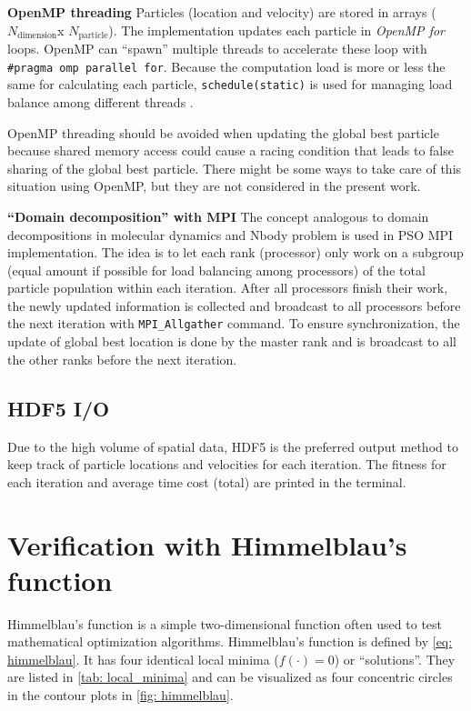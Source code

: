 \documentclass[conference, 10pt]{IEEEtran}
\newcommand{\N}[1]{\ensuremath{N_\text{#1}}}
\newcommand{\Np}{\N{particle}}
\newcommand{\Ndim}{\N{dimension}}
\newcommand{\code}[1]{\texttt{\textcolor{BrickRed}{#1}}}
\begin{document}
\noindent\textbf{OpenMP threading}
Particles (location and velocity) are stored in arrays (\Ndim x \Np).
The implementation updates each particle in \emph{OpenMP for} loops.
OpenMP can ``spawn'' multiple threads to accelerate these loop with \code{\#pragma omp parallel for}.
Because the computation load is more or less the same for calculating each particle, \code{schedule(static)} is used for managing load balance among different threads \cite{eijkhout_2016, eijkhout_2016_2}.

OpenMP threading should be avoided when updating the global best particle because shared memory access could cause a racing condition that leads to false sharing of the global best particle.
There might be some ways to take care of this situation using OpenMP, but they are not considered in the present work. 
\medskip


\noindent\textbf{``Domain decomposition'' with MPI}
The concept analogous to domain decompositions in molecular dynamics and Nbody problem \cite{eijkhout_2016, Bindel_2010} is used in PSO MPI implementation.
The idea is to let each rank (processor) only work on a subgroup (equal amount if possible for load balancing among processors) of the total particle population within each iteration.
After all processors finish their work, the newly updated information is collected and broadcast to all processors before the next iteration with \code{MPI\_Allgather} command.
To ensure synchronization, the update of global best location is done by the master rank and is broadcast to all the other ranks before the next iteration.
\medskip


\subsection{HDF5 I/O}
Due to the high volume of spatial data, HDF5 is the preferred output method to keep track of particle locations and velocities for each iteration. 
The fitness for each iteration and average time cost (total) are printed in the terminal. 


\section{Verification with Himmelblau's function}

Himmelblau's function is a simple two-dimensional function often used to test mathematical optimization algorithms.
Himmelblau's function \cite{Himmelblau_1972} is defined by \cref{eq: himmelblau}.
It has four identical local minima ($f(\cdot)=0$) or ``solutions''.
They are listed in \cref{tab: local_minima} and can be visualized as four concentric circles in the contour plots in \cref{fig: himmelblau}. 
\end{document}
